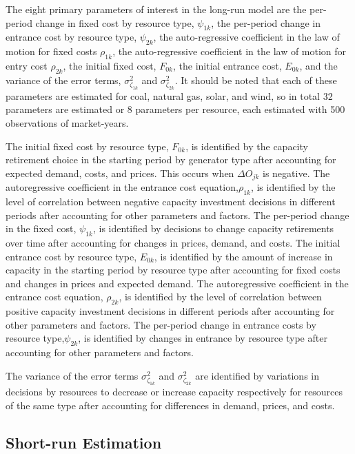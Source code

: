 \documentclass[12pt]{article}
\begin{document}
The eight primary parameters of interest in the long-run model are the per-period change in fixed cost by resource type, $\psi_{1k}$, the per-period change in entrance cost by resource type, $\psi_{2k}$, the auto-regressive coefficient in the law of motion for fixed costs $\rho_{1k}$, the auto-regressive coefficient in the law of motion for entry cost $\rho_{2k}$, the initial fixed cost, $F_{0k}$, the initial entrance cost, $E_{0k}$, and the variance of the error terms, $\sigma^2_{\zeta_{1k}}$ and $\sigma^2_{\zeta_{2k}}$. It should be noted that each of these parameters are estimated for coal, natural gas, solar, and wind, so in total 32 parameters are estimated or 8 parameters per resource, each estimated with 500 observations of market-years.

The initial fixed cost by resource type, $F_{0k}$, is identified by the capacity retirement choice in the starting period by generator type after accounting for expected demand, costs, and prices. This occurs when $\Delta O_{jk}$ is negative. The autoregressive coefficient in the entrance cost equation,$\rho_{1k}$, is identified by the level of correlation between negative capacity investment decisions in different periods after accounting for other parameters and factors. The per-period change in the fixed cost, $\psi_{1k}$, is identified by decisions to change capacity retirements over time after accounting for changes in prices, demand, and costs. The initial entrance cost by resource type, $E_{0k}$, is identified by the amount of increase in capacity in the starting period by resource type after accounting for fixed costs and changes in prices and expected demand. The autoregressive coefficient in the entrance cost equation, $\rho_{2k}$, is identified by the level of correlation between positive capacity investment decisions in different periods after accounting for other parameters and factors. The per-period change in entrance costs by resource type,$\psi_{2k}$, is identified by changes in entrance by resource type after accounting for other parameters and factors.

The variance of the error terms $\sigma_{\zeta_{1k}}^2$ and $\sigma_{\zeta_{2k}}^2$ are identified by variations in decisions by resources to decrease or increase capacity respectively for resources of the same type after accounting for differences in demand, prices, and costs.

\subsection{Short-run Estimation}
\end{document}
